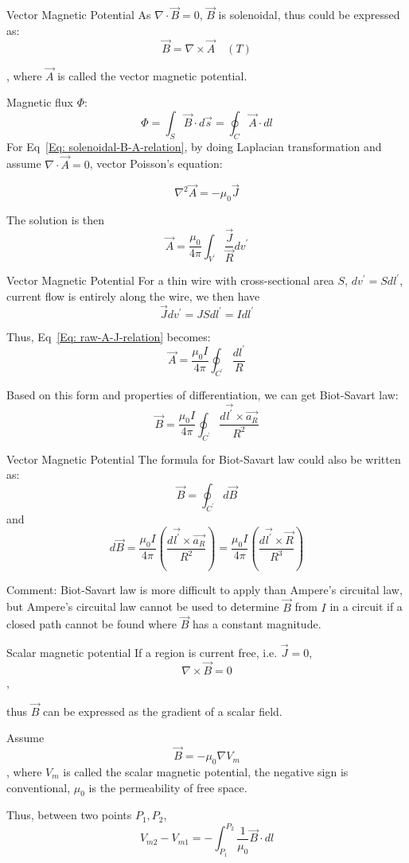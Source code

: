 \documentclass[xcolor={dvipsnames}]{beamer}
\begin{document}
\begin{frame}{Vector Magnetic Potential}
As $\nabla\cdot\vec{B} = 0$, $\vec{B}$ is solenoidal, thus could be expressed as:
\begin{equation}\label{Eq: solenoidal-B-A-relation}
  \vec{B} = \nabla\times \vec{A} \quad (T)
\end{equation}


, where $\vec{A}$ is called the vector magnetic potential.

Magnetic flux $\Phi$:
$$
\Phi = \int_S \vec{B}\cdot d\vec{s} = \oint_C\vec{A}\cdot dl
$$
For Eq~\ref{Eq: solenoidal-B-A-relation}, by doing Laplacian transformation and assume $\nabla\cdot\vec{A} = 0$, vector Poisson's equation:

$$
\nabla^2\vec{A} = -\mu_0\vec{J}
$$

The solution is then 
\begin{equation}\label{Eq: raw-A-J-relation}
  \vec{A} = \frac{\mu_0}{4\pi}\int_{V^\prime} \frac{\vec{J}}{\vec{R}}dv^\prime
\end{equation}
\end{frame}
\begin{frame}{Vector Magnetic Potential}
For a thin wire with cross-sectional area $S$, $dv^\prime = Sdl^\prime$, current flow is entirely along the wire, we then have
$$
\vec{J} dv^\prime = JSdl^\prime = Idl^\prime
$$

Thus, Eq~\ref{Eq: raw-A-J-relation} becomes:
$$
\vec{A} = \frac{\mu_0I}{4\pi} \oint_{C^\prime}\frac{dl^\prime}{R}
$$

Based on this form and properties of differentiation, we can get Biot-Savart law:
$$
\vec{B} = \frac{\mu_0 I}{4\pi}\oint_{C^\prime}\frac{d\vec{l^\prime}\times\vec{a_R}}{R^2}
$$
\end{frame}
\begin{frame}{Vector Magnetic Potential}
The formula for Biot-Savart law could also be written as:
$$
\vec{B} = \oint_{C^\prime}d\vec{B}
$$
and 
$$
d\vec{B} = \frac{\mu_0 I}{4\pi} \left(\frac{d\vec{l^\prime}\times \vec{a_R}}{R^2}\right) = \frac{\mu_0 I}{4\pi} \left(\frac{d\vec{l^\prime}\times \vec{R}}{R^3}\right)
$$

Comment: Biot-Savart law is more difficult to apply than Ampere's circuital law, but Ampere's circuital law cannot be used to determine $\vec{B}$ from $I$ in a circuit if a closed path cannot be found where $\vec{B}$ has a constant magnitude.
\end{frame}
\begin{frame}{Scalar magnetic potential}
If a region is current free, i.e. $\vec{J} = 0$, $$\nabla\times\vec{B} = 0$$,

thus $\vec{B}$ can be expressed as the gradient of a scalar field.

Assume 
\begin{equation}\label{Eq: calculate-B-by-Vm}
  \vec{B} = -\mu_0 \nabla V_m
\end{equation}
, where $V_m$ is called the scalar magnetic potential, the negative sign is conventional, $\mu_0$ is the permeability of free space.

Thus, between two points $P_1, P_2$, 
$$
V_{m2} - V_{m1} = -\int_{P_1}^{P_2} \frac{1}{\mu_0}\vec{B}\cdot dl
$$
\end{frame}
\end{document}
